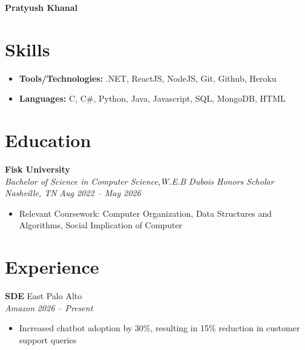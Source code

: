 \documentclass[letterpaper,11pt]{article}
\begin{document}
\begin{center}
  {\LARGE\bfseries Pratyush Khanal} \\[4pt]
  \small
          \end{center}




\section{Skills}
\begin{itemize}[label={}]
  \item \textbf{Tools/Technologies:} .NET, ReactJS, NodeJS, Git, Github, Heroku
  \item \textbf{Languages:} C, C\#, Python, Java, Javascript, SQL, MongoDB, HTML
\end{itemize}


\section{Education}
\textbf{Fisk University} \hfill  \\
\textit{Bachelor of Science in Computer Science,W.E.B Dubois Honors Scholar Nashville, TN} \hfill \textit{Aug 2022 -- May 2026}
\begin{itemize}
  \item Relevant Coursework: Computer Organization, Data Structures and Algorithms, Social Implication of Computer
\end{itemize}
\vspace{2pt}





\section{Experience}
\textbf{SDE} \hfill East Palo Alto \\
\textit{Amazon} \hfill \textit{2026 -- Present}
\begin{itemize}
  \item Increased chatbot adoption by 30\%, resulting in 15\% reduction in customer support queries
\end{itemize}
\vspace{2pt}
\end{document}
